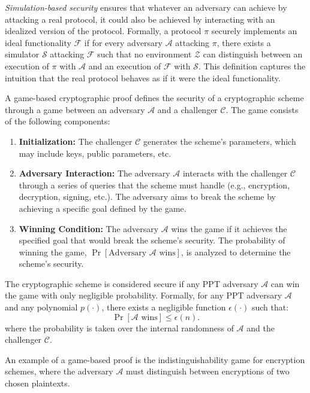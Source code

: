 \documentclass{iacrtrans}
\begin{document}
\textit{Simulation-based security} ensures that whatever an adversary can achieve by attacking a real protocol, it could also be achieved by interacting with an idealized version of the protocol. Formally, a protocol $\pi$ securely implements an ideal functionality $\mathcal{F}$ if for every adversary $\mathcal{A}$ attacking $\pi$, there exists a simulator $\mathcal{S}$ attacking $\mathcal{F}$ such that no environment $\mathcal{Z}$ can distinguish between an execution of $\pi$ with $\mathcal{A}$ and an execution of $\mathcal{F}$ with $\mathcal{S}$. This definition captures the intuition that the real protocol behaves as if it were the ideal functionality.

\begin{definition}
	A game-based cryptographic proof defines the security of a cryptographic scheme through a game between an adversary $\mathcal{A}$ and a challenger $\mathcal{C}$. The game consists of the following components:
	\begin{enumerate}
		\item \textbf{Initialization:} The challenger $\mathcal{C}$ generates the scheme's parameters, which may include keys, public parameters, etc.
		\item \textbf{Adversary Interaction:} The adversary $\mathcal{A}$ interacts with the challenger $\mathcal{C}$ through a series of queries that the scheme must handle (e.g., encryption, decryption, signing, etc.). The adversary aims to break the scheme by achieving a specific goal defined by the game.
		\item \textbf{Winning Condition:} The adversary $\mathcal{A}$ wins the game if it achieves the specified goal that would break the scheme's security. The probability of winning the game, $\Pr[\text{Adversary } \mathcal{A} \text{ wins}]$, is analyzed to determine the scheme's security.
	\end{enumerate}
	The cryptographic scheme is considered secure if any PPT adversary $\mathcal{A}$ can win the game with only negligible probability. Formally, for any PPT adversary $\mathcal{A}$ and any polynomial $p(\cdot)$, there exists a negligible function $\epsilon(\cdot)$ such that:
	\[
		\Pr[\mathcal{A} \text{ wins}] \leq \epsilon(n).
	\]
	where the probability is taken over the internal randomness of $\mathcal{A}$ and the challenger $\mathcal{C}$.
\end{definition}

An example of a game-based proof is the indistinguishability game for encryption schemes, where the adversary $\mathcal{A}$ must distinguish between encryptions of two chosen plaintexts.
\end{document}
